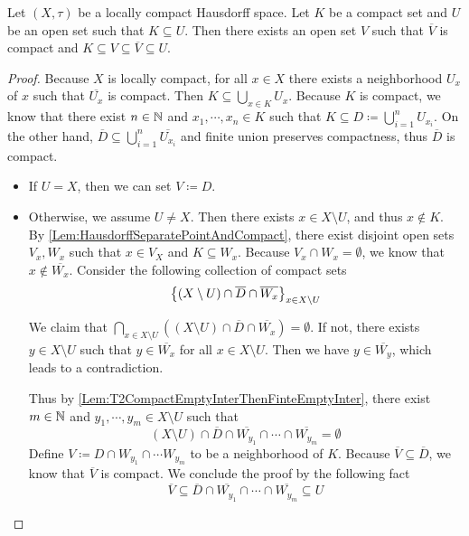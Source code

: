 \documentclass[screen]{techreport}
\numberwithin{equation}{section}
\begin{document}
\begin{lemma}\label{Lem:LocCompT2ThenNeighborContainCompactClosure}
	Let $(X,\tau)$ be a locally compact Hausdorff space.
	Let $K$ be a compact set and $U$ be an open set such that $K \subseteq U$.
	Then there exists an open set $V$ such that $\overline{V}$ is compact and $K \subseteq V \subseteq \overline{V} \subseteq U$.
\end{lemma}
\begin{proof}
	Because $X$ is locally compact, for all $x \in X$ there exists a neighborhood $U_x$ of $x$ such that $\overline{U_x}$ is compact.
	Then $K \subseteq \bigcup_{x \in K} U_x$.
	Because $K$ is compact, we know that there exist $n \in \mathbb{N}$ and $x_1,\cdots,x_n \in K$ such that $K \subseteq D \coloneqq \bigcup_{i=1}^n U_{x_i}$.
	On the other hand, $\overline{D} \subseteq \bigcup_{i=1}^n \overline{U_{x_i}}$ and finite union preserves compactness, thus $\overline{D}$ is compact.
	\begin{itemize}
		\item If $U = X$, then we can set $V \coloneqq D$.
		\item Otherwise, we assume $U \neq X$.
		Then there exists $x \in X \setminus U$, and thus $x \not\in K$.
		By \cref{Lem:HausdorffSeparatePointAndCompact}, there exist disjoint open sets $V_x,W_x$ such that $x \in V_X$ and $K \subseteq W_x$.
		Because $V_x \cap W_x = \emptyset$, we know that $x \not\in \overline{W_x}$.
		Consider the following collection of compact sets
		\[
		\left\{ { (X \setminus U) \cap \overline{D} \cap \overline{W_x} } \right\}_{x \in X \setminus U}
		\]
		
		We claim that $\bigcap_{x \in X \setminus U} ((X \setminus U) \cap \overline{D} \cap \overline{W_x}) = \emptyset$.
		If not, there exists $y \in X \setminus U$ such that $y \in \overline{W_x}$ for all $x \in X \setminus U$. Then we have $y \in \overline{W_y}$, which leads to a contradiction.
		
		Thus by \cref{Lem:T2CompactEmptyInterThenFinteEmptyInter}, there exist $m \in \mathbb{N}$ and $y_1,\cdots,y_m \in X \setminus U$ such that
		\[
		(X \setminus U) \cap \overline{D} \cap \overline{W_{y_1}} \cap \cdots \cap \overline{W_{y_m}} = \emptyset
		\]
		Define $V \coloneqq D \cap W_{y_1} \cap \cdots W_{y_m}$ to be a neighborhood of $K$.
		Because $\overline{V} \subseteq \overline{D}$, we know that $\overline{V}$ is compact.
		We conclude the proof by the following fact
		\[
		\overline{V} \subseteq \overline{D} \cap \overline{W_{y_1}} \cap \cdots \cap \overline{W_{y_m}} \subseteq U
		\]
	\end{itemize}
\end{proof}
\end{document}
